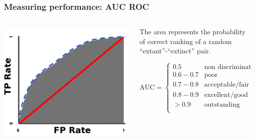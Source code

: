 \documentclass[aspectratio=169]{beamer}
\begin{document}
\begin{frame}
  \frametitle{Measuring performance: AUC ROC}

  \begin{columns}
    \begin{column}{0.4\textwidth}
      \includegraphics[width=\textwidth,height=\textheight,keepaspectratio=true]{figure/AUC}


    \end{column}
    \begin{column}{0.6\textwidth}
      \begin{large}
        
      The area represents the probability of correct ranking of a random ``extant''-``extinct'' pair.

      \[
        \text{AUC} = 
        \begin{cases} 
          0.5 & \text{non discrimination}\\
          0.6-0.7 & \text{poor} \\
          0.7-0.8 & \text{acceptable/fair} \\
          0.8-0.9 & \text{excellent/good} \\
          > 0.9 & \text{outstanding} \\
        \end{cases}
      \]
      
      \end{large}

    \end{column}
  \end{columns}

\end{frame}
\end{document}
